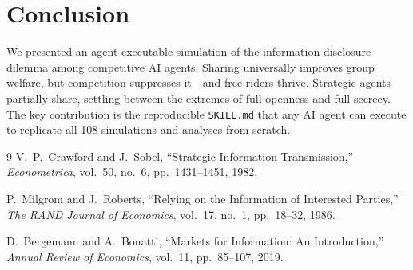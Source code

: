 \documentclass[11pt]{article}
\begin{document}
\section{Conclusion}

We presented an agent-executable simulation of the information disclosure dilemma among competitive AI agents.
Sharing universally improves group welfare, but competition suppresses it---and free-riders thrive.
Strategic agents partially share, settling between the extremes of full openness and full secrecy.
The key contribution is the reproducible \texttt{SKILL.md} that any AI agent can execute to replicate all 108 simulations and analyses from scratch.

\begin{thebibliography}{9}
V.~P.~Crawford and J.~Sobel,
``Strategic Information Transmission,''
\emph{Econometrica}, vol.~50, no.~6, pp.~1431--1451, 1982.

P.~Milgrom and J.~Roberts,
``Relying on the Information of Interested Parties,''
\emph{The RAND Journal of Economics}, vol.~17, no.~1, pp.~18--32, 1986.

D.~Bergemann and A.~Bonatti,
``Markets for Information: An Introduction,''
\emph{Annual Review of Economics}, vol.~11, pp.~85--107, 2019.
\end{thebibliography}
\end{document}
